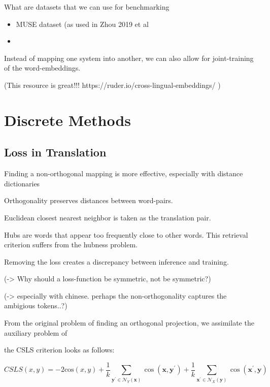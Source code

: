 \documentclass[a4paper,12pt,twoside,openright]{report}
\begin{document}
What are datasets that we can use for benchmarking

\begin{itemize}
\item MUSE dataset (as used in Zhou 2019 et al
\item 
\end{itemize}

Instead of mapping one system into another, we can also allow for joint-training of the word-embeddings.

(This resource is great!!!
https://ruder.io/cross-lingual-embeddings/
)





\section{Discrete Methods }

\subsection{Loss in Translation}

Finding a non-orthogonal mapping is more effective, especially with distance dictionaries

Orthogonality preserves distances between word-pairs.

Euclidean closest nearest neighbor is taken as the translation pair.

Hubs are words that appear too frequently close to other words.
This retrieval criterion suffers from the hubness problem.

Removing the loss creates a discrepancy between inference and training.

(-> Why should a loss-function be symmetric, not be symmetric?)

(-> especially with chinese. perhaps the non-orthogonality captures the ambigious tokens..?)

From the original problem of finding an orthogonal projection, we assimilate the auxiliary problem of

the CSLS criterion looks as follows:

\begin{equation}
CSLS(x, y) = - 2 \text{cos}(x, y) + \frac{1}{k} \sum_{\mathbf{y}^{\prime} \in \mathcal{N}_{Y}(\mathbf{x})} \cos \left(\mathbf{x}, \mathbf{y}^{\prime}\right)+\frac{1}{k} \sum_{\mathbf{x}^{\prime} \in \mathcal{N}_{X}(\mathbf{y})} \cos \left(\mathbf{x}^{\prime}, \mathbf{y}\right)
\end{equation}
\end{document}
